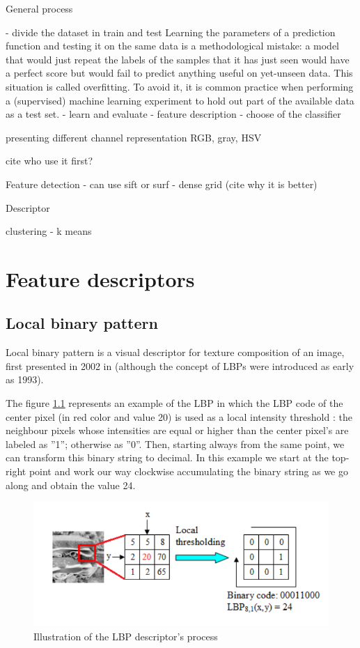 General process

- divide the dataset in train and test
Learning the parameters of a prediction function and testing it on the same data is a methodological mistake: a model that would just repeat the labels of the samples that it has just seen would have a perfect score but would fail to predict anything useful on yet-unseen data. This situation is called overfitting. To avoid it, it is common practice when performing a (supervised) machine learning experiment to hold out part of the available data as a test set.
- learn and evaluate
- feature description
- choose of the classifier

presenting different channel representation
RGB, gray, HSV

cite who use it first?

Feature detection
- can use sift or surf
- dense grid (cite why it is better)

Descriptor

clustering
- k means

\chapter{Feature descriptors}

\section{Local binary pattern}


Local binary pattern is a visual descriptor for texture composition of an image, first presented in 2002 in \cite{Ojala2002} (although the concept of LBPs were introduced as early as 1993).

The figure \ref{fig:lbp_process} represents an example of the LBP in which the LBP code of the center pixel (in red color and value 20) is used as a local intensity threshold : the neighbour pixels whose intensities are equal or higher than the center pixel’s are labeled as ”1”; otherwise as ”0”. Then, starting always from the same point, we can transform this binary string to decimal. In this example we start at the top-right point and work our way clockwise accumulating the binary string as we go along and obtain the value 24.

\begin{figure}[h]
    \includegraphics[scale=0.55]{img/lbp}
    \caption{Illustration of the LBP descriptor's process}
    \label{fig:lbp_process}
\end{figure}

